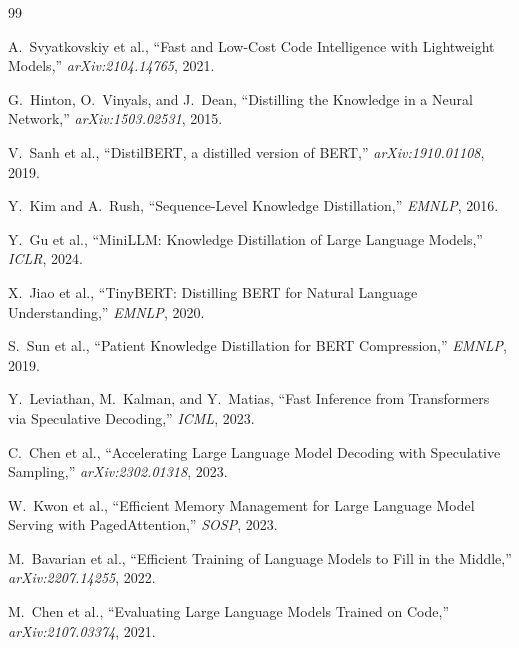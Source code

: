\documentclass[11pt,a4paper]{article}
\begin{document}
\begin{thebibliography}{99}

A.~Svyatkovskiy et al., ``Fast and Low-Cost Code Intelligence with Lightweight Models,''
\textit{arXiv:2104.14765}, 2021.

G.~Hinton, O.~Vinyals, and J.~Dean, ``Distilling the Knowledge in a Neural Network,''
\textit{arXiv:1503.02531}, 2015.

V.~Sanh et al., ``DistilBERT, a distilled version of BERT,'' \textit{arXiv:1910.01108}, 2019.

Y.~Kim and A.~Rush, ``Sequence-Level Knowledge Distillation,'' \textit{EMNLP}, 2016.

Y.~Gu et al., ``MiniLLM: Knowledge Distillation of Large Language Models,''
\textit{ICLR}, 2024.

X.~Jiao et al., ``TinyBERT: Distilling BERT for Natural Language Understanding,''
\textit{EMNLP}, 2020.

S.~Sun et al., ``Patient Knowledge Distillation for BERT Compression,''
\textit{EMNLP}, 2019.

Y.~Leviathan, M.~Kalman, and Y.~Matias, ``Fast Inference from Transformers via Speculative
Decoding,'' \textit{ICML}, 2023.

C.~Chen et al., ``Accelerating Large Language Model Decoding with Speculative Sampling,''
\textit{arXiv:2302.01318}, 2023.

W.~Kwon et al., ``Efficient Memory Management for Large Language Model Serving with PagedAttention,''
\textit{SOSP}, 2023.

M.~Bavarian et al., ``Efficient Training of Language Models to Fill in the Middle,''
\textit{arXiv:2207.14255}, 2022.

M.~Chen et al., ``Evaluating Large Language Models Trained on Code,''
\textit{arXiv:2107.03374}, 2021.

\end{thebibliography}
\end{document}
